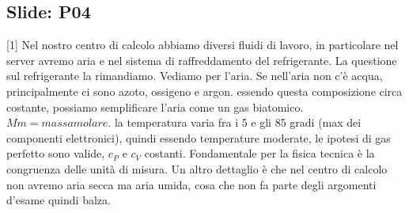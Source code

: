 \subsection{Slide: P04}
[1]
\newline[2] Nel nostro centro di calcolo abbiamo diversi fluidi di lavoro, in particolare nel server avremo aria e nel sistema di raffreddamento del refrigerante.
\newline[3]
\newline[4] La questione sul refrigerante la rimandiamo. Vediamo per l'aria. Se nell'aria non c'è acqua, principalmente ci sono azoto, ossigeno e argon. essendo questa composizione circa costante, possiamo semplificare l'aria come un gas biatomico. $Mm = massa molare$.
\newline[5] la temperatura varia fra i 5 e gli 85 gradi (max dei componenti elettronici), quindi essendo temperature moderate, le ipotesi di gas perfetto sono valide, $c_P$ e $c_V$ costanti. Fondamentale per la fisica tecnica è la congruenza delle unità di misura.
\newline[6] Un altro dettaglio è che nel centro di calcolo non avremo aria secca ma aria umida, cosa che non fa parte degli argomenti d'esame quindi balza.